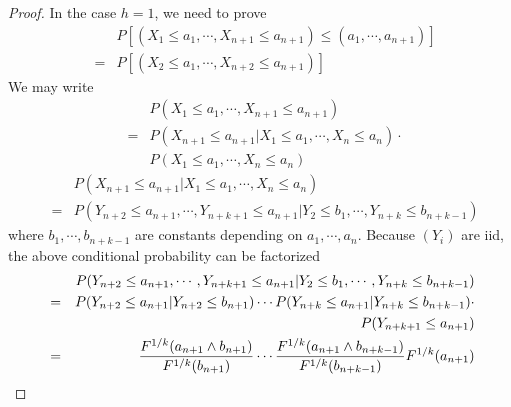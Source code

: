 \documentclass{report}
\begin{document}
\begin{enumerate}[1.]
\begin{enumerate}[(a)]
\begin{proof}
      In the case $h=1$, we need to prove
      \begin{eqnarray*}
        && P\left[(X_1 \le a_1, \cdots, X_{n+1} \le a_{n+1}) \le (a_1,
          \cdots, a_{n+1}) \right] \\
        &=& P\left[(X_2 \le a_1, \cdots, X_{n+2} \le a_{n+1}) \right]
      \end{eqnarray*}
      We may write
      \begin{eqnarray*}
        && P(X_1 \le a_1, \cdots, X_{n+1} \le a_{n+1}) \\
        &=& P(X_{n+1} \le a_{n+1} | X_1 \le a_1, \cdots, X_{n} \le
        a_{n}) \cdot \\
        && P(X_1 \le a_1, \cdots, X_{n} \le a_{n})
      \end{eqnarray*}
      \begin{eqnarray*}
        && P(X_{n+1} \le a_{n+1} | X_1 \le a_1, \cdots, X_{n} \le
        a_{n}) \\
        &=& P(Y_{n+2} \le a_{n+1}, \cdots, Y_{n+k+1} \le a_{n+1} | Y_2
        \le b_1, \cdots, Y_{n+k} \le b_{n+k-1})
      \end{eqnarray*}
      where $b_1, \cdots, b_{n+k-1}$ are constants depending on $a_1,
      \cdots, a_n$. Because $(Y_i)$ are iid, the above conditional
      probability can be factorized
      \begin{eqnarray*}
        && P(Y_{n+2} \le a_{n+1}, \cdots, Y_{n+k+1} \le a_{n+1} | Y_2
        \le b_1, \cdots, Y_{n+k} \le b_{n+k-1}) \\
        &=& P(Y_{n+2} \le a_{n+1} | Y_{n+2} \le b_{n+1}) \cdots
      P(Y_{n+k} \le a_{n+1} | Y_{n+k} \le b_{n+k-1}) \cdot \\
      && P(Y_{n+k+1} \le a_{n+1}) \\
      &=& {F^{1/k}(a_{n+1} \wedge b_{n+1}) \over F^{1/k}(b_{n+1})} \cdots
      {F^{1/k}(a_{n+1} \wedge b_{n+k-1}) \over F^{1/k}(b_{n+k-1})}
      F^{1/k}(a_{n+1})
    \end{eqnarray*}
    

\end{proof}
\end{enumerate}
\end{enumerate}
\end{document}
